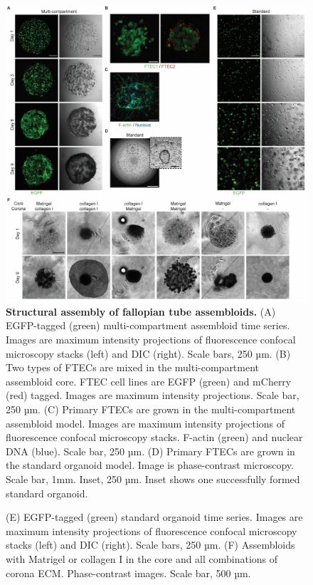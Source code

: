 \begin{refsection}
    \begin{figure}[p]
        \begin{center}
            \includegraphics[width=1\textwidth,height=0.85\textheight,keepaspectratio,clip,page=1]{figures/chapter4/fig_S1.jpg}
            \captionsetup{font=small}
            \caption{\textbf{Structural assembly of fallopian tube assembloids.} (A) EGFP-tagged (green) multi-compartment assembloid time series. Images are maximum intensity projections of fluorescence confocal microscopy stacks (left) and DIC (right). Scale bars, 250 µm. (B) Two types of FTECs are mixed in the multi-compartment assembloid core. FTEC cell lines are EGFP (green) and mCherry (red) tagged. Images are maximum intensity projections. Scale bar, 250 µm. (C) Primary FTECs are grown in the multi-compartment assembloid model. Images are maximum intensity projections of fluorescence confocal microscopy stacks. F-actin (green) and nuclear DNA (blue). Scale bar, 250 µm. (D) Primary FTECs are grown in the standard organoid model. Image is phase-contrast microscopy. Scale bar, 1mm. Inset, 250 µm. Inset shows one successfully formed standard organoid. }
            \label{chapter4_figS1}
        \end{center}
    \end{figure}
    
    \begin{figure}[h!]
        \ContinuedFloat
        \captionsetup{font=small}
        \caption[]{  (E) EGFP-tagged (green) standard organoid time series. Images are maximum  intensity projections of fluorescence confocal microscopy stacks (left) and DIC (right). Scale bars, 250 µm. (F) Assembloids with Matrigel or collagen I in the core and all combinations of corona ECM. Phase-contrast images. Scale bar, 500 µm.}
    \end{figure}
    

\end{refsection}

